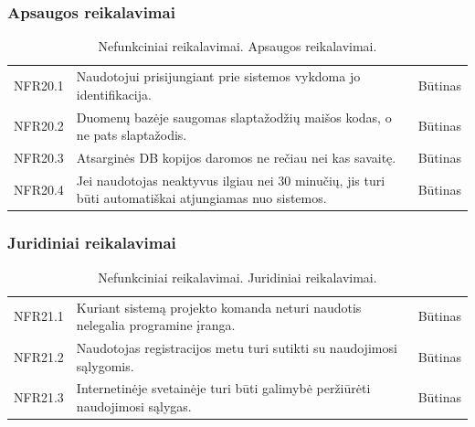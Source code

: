 \documentclass{VUMIFPSkursinis}
\begin{document}
\subsubsection{Apsaugos reikalavimai}
\begin{table}[H]
\caption{Nefunkciniai reikalavimai. Apsaugos reikalavimai.}
\centering
\normalsize
\begin{tabular}{|p{2cm}|p{10cm}|p{3cm}|}
\hline
\rowcolor{gray!30}
\multicolumn{3}{|l|}{\textbf{Apsaugos reikalavimai}} \\ \hline
NFR20.1 & \multicolumn{1}{m{10cm}|}{Naudotojui prisijungiant prie sistemos vykdoma jo identifikacija.} & Būtinas \\ \hline
NFR20.2 & \multicolumn{1}{m{10cm}|}{Duomenų bazėje saugomas slaptažodžių maišos kodas, o ne pats slaptažodis.} & Būtinas \\ \hline
NFR20.3 & \multicolumn{1}{m{10cm}|}{Atsarginės DB kopijos daromos ne rečiau nei kas savaitę.} & Būtinas \\ \hline
NFR20.4 & \multicolumn{1}{m{10cm}|}{Jei naudotojas neaktyvus ilgiau nei 30 minučių, jis turi būti automatiškai atjungiamas nuo sistemos.} & Būtinas \\ \hline
\end{tabular}
\end{table}
\subsubsection{Juridiniai reikalavimai}
\begin{table}[H]
\caption{Nefunkciniai reikalavimai. Juridiniai reikalavimai.}
\centering
\normalsize
\begin{tabular}{|p{2cm}|p{10cm}|p{3cm}|}
\hline
\rowcolor{gray!30}
\multicolumn{3}{|l|}{\textbf{Juridiniai reikalavimai}} \\ \hline
NFR21.1 & \multicolumn{1}{m{10cm}|}{Kuriant sistemą projekto komanda neturi naudotis nelegalia programine įranga.} & Būtinas \\ \hline
NFR21.2 & \multicolumn{1}{m{10cm}|}{Naudotojas registracijos metu turi sutikti su naudojimosi sąlygomis.} & Būtinas \\ \hline
NFR21.3 & \multicolumn{1}{m{10cm}|}{Internetinėje svetainėje turi būti galimybė peržiūrėti naudojimosi sąlygas.} & Būtinas \\ \hline
\end{tabular}
\end{table}

\newpage
\end{document}
